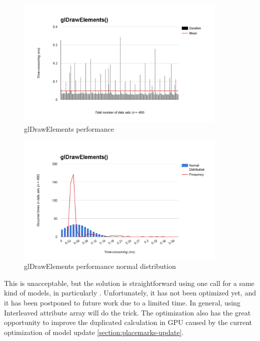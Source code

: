 \begin{figure}[H]
	\caption{glDrawElements performance}
	\label{fig:glDrawElements-performance}
	\centering
	\includegraphics[width=0.9\textwidth, keepaspectratio]{Figures/glDrawElements-performance.png}
	\decoRule
\end{figure}

\begin{figure}[H]
	\caption{glDrawElements performance normal distribution}
	\label{fig:glDrawElements-performance-normal-distribution}
	\centering
	\includegraphics[width=0.9\textwidth, keepaspectratio]{Figures/glDrawElements-performance-normal-distribution.png}
	\decoRule
\end{figure}

This is unacceptable, but the solution is straightforward using one  call for a same kind of models, in particularly . Unfortunately, it has not been optimized yet, and it has been postponed to future work due to a limited time. In general, using Interleaved attribute array will do the trick. The optimization also has the great opportunity to improve the duplicated calculation in GPU caused by the current optimization of model update \ref{section:placemarks-update}.

